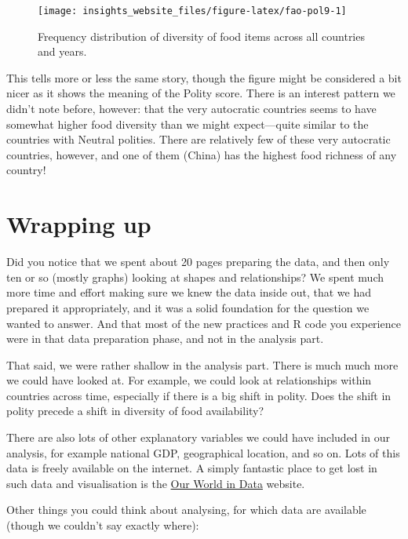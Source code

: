\documentclass[]{book}
\begin{document}
\begin{figure}

{\centering \texttt{[image: insights\_website\_files/figure-latex/fao-pol9-1]} 

}

\caption{Frequency distribution of diversity of food items across all countries and years.}\label{fig:fao-pol9}
\end{figure}

This tells more or less the same story, though the figure might be considered a bit nicer as it shows the meaning of the Polity score. There is an interest pattern we didn't note before, however: that the very autocratic countries seems to have somewhat higher food diversity than we might expect---quite similar to the countries with Neutral polities. There are relatively few of these very autocratic countries, however, and one of them (China) has the highest food richness of any country!

\hypertarget{wrapping-up}{%
\section{Wrapping up}\label{wrapping-up}}

Did you notice that we spent about 20 pages preparing the data, and then only ten or so (mostly graphs) looking at shapes and relationships? We spent much more time and effort making sure we knew the data inside out, that we had prepared it appropriately, and it was a solid foundation for the question we wanted to answer. And that most of the new practices and R code you experience were in that data preparation phase, and not in the analysis part.

That said, we were rather shallow in the analysis part. There is much much more we could have looked at. For example, we could look at relationships within countries across time, especially if there is a big shift in polity. Does the shift in polity precede a shift in diversity of food availability?

There are also lots of other explanatory variables we could have included in our analysis, for example national GDP, geographical location, and so on. Lots of this data is freely available on the internet. A simply fantastic place to get lost in such data and visualisation is the \href{https://ourworldindata.org/}{Our World in Data} website.

Other things you could think about analysing, for which data are available (though we couldn't say exactly where):
\end{document}
